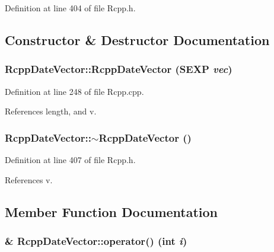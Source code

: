 Definition at line 404 of file Rcpp.h.

\subsection{Constructor \& Destructor Documentation}
\hypertarget{classRcppDateVector_65de4c0807f5c4b33429c8ebb5224831}{
\subsubsection[RcppDateVector]{\setlength{\rightskip}{0pt plus 5cm}RcppDateVector::RcppDateVector (SEXP {\em vec})}}
\label{classRcppDateVector_65de4c0807f5c4b33429c8ebb5224831}




Definition at line 248 of file Rcpp.cpp.

References length, and v.\hypertarget{classRcppDateVector_ad0851f7555a09615ccb17bcb20fc7f1}{
\subsubsection[$\sim$RcppDateVector]{\setlength{\rightskip}{0pt plus 5cm}RcppDateVector::$\sim$RcppDateVector ()}}
\label{classRcppDateVector_ad0851f7555a09615ccb17bcb20fc7f1}




Definition at line 407 of file Rcpp.h.

References v.

\subsection{Member Function Documentation}
\hypertarget{classRcppDateVector_7a6d9ceb233ed06f037013bdf4088a23}{
\subsubsection[operator()]{\& RcppDateVector::operator() (int {\em i})}}
\label{classRcppDateVector_7a6d9ceb233ed06f037013bdf4088a23}




